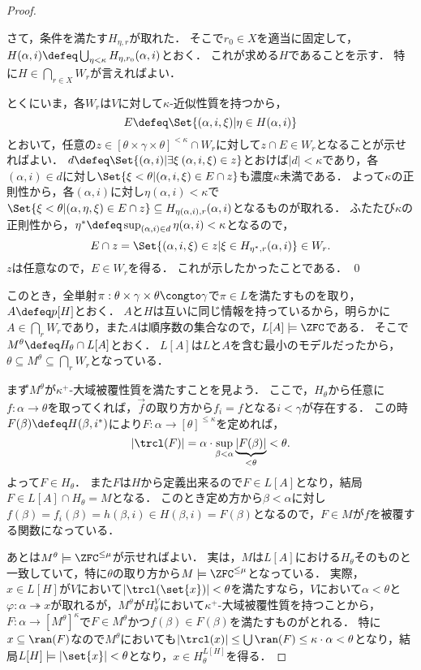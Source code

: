 \documentclass[a4j,leqno]{ltjsarticle}
\begin{document}
\begin{proof}
\begin{subproof}
  さて，条件を満たす$H_{\eta, r}$が取れた．
  そこで$r_0 \in X$を適当に固定して，$H(\alpha, i) \defeq \bigcup_{\eta < \kappa} H_{\eta, r_0}(\alpha, i)$とおく．
  これが求める$H$であることを示す．
  特に$H \in \bigcap_{r\in X} W_r$が言えればよい．

  とくにいま，各$W_r$は$V$に対して$\kappa$-近似性質を持つから，
  \[
   E \defeq \Set{ (\alpha, i, \xi) | \eta \in H(\alpha, i)}
  \]
  とおいて，任意の$z \in [\theta \times \gamma \times \theta]^{<\kappa} \cap W_r$に対して$z \cap E \in W_r$となることが示せればよい．
  $d \defeq \Set{ (\alpha, i) | \exists \xi \: (\alpha, i, \xi) \in z}$とおけば$|d| < \kappa$であり，各$(\alpha, i) \in d$に対し$\Set{\xi < \theta | (\alpha, i, \xi) \in E \cap z}$も濃度$\kappa$未満である．
  よって$\kappa$の正則性から，各$(\alpha, i)$に対し$\eta(\alpha, i) < \kappa$で$\Set{\xi < \theta | (\alpha, \eta, \xi) \in E \cap z} \subseteq H_{\eta(\alpha, i), r}(\alpha, i)$となるものが取れる．
  ふたたび$\kappa$の正則性から，$\eta^* \defeq \sup_{(\alpha, i) \in d} \eta(\alpha, i) < \kappa$となるので，
  \[
   E \cap z = \Set{ (\alpha, i, \xi) \in z | \xi \in H_{\eta^*, r}(\alpha, i)} \in W_r.
  \]
  $z$は任意なので，$E \in W_r$を得る．
  これが示したかったことである． \qed
 \end{subproof}
 このとき，全単射$\pi: \theta \times \gamma \times \theta \congto \gamma$で$\pi \in L$を満たすものを取り，$A \defeq p[H]$とおく．
 $A$と$H$は互いに同じ情報を持っているから，明らかに$A \in \bigcap_r W_r$であり，また$A$は順序数の集合なので，$L[A]\models \ZFC$である．
 そこで$M^\theta \defeq H_\theta \cap L[A]$とおく．
 $L[A]$は$L$と$A$を含む最小のモデルだったから，$\theta \subseteq M^\theta \subseteq \bigcap_r W_r$となっている．

 まず$M^\theta$が$\kappa^+$-大域被覆性質を満たすことを見よう．
 ここで，$H_\theta$から任意に$f: \alpha \to \theta$を取ってくれば，$\vec{f}$の取り方から$f_i = f$となる$i < \gamma$が存在する．
 この時$F(\beta) \defeq H(\beta, i^*)$により$F: \alpha \to [\theta]^{\leq \kappa}$を定めれば，
 \[
  \left| \trcl(F) \right| = \alpha \cdot \sup_{\beta < \alpha} \underbrace{|F(\beta)|}_{< \theta} < \theta.
 \]
 よって$F \in H_\theta$．
 また$F$は$H$から定義出来るので$F \in L[A]$となり，結局$F \in L[A] \cap H_\theta = M$となる．
 このとき定め方から$\beta < \alpha$に対し$f(\beta) = f_i(\beta) = h(\beta, i) \in H(\beta, i) = F(\beta)$となるので，$F \in M$が$f$を被覆する関数になっている．

 あとは$M^\theta \models \ZFC^{\leq\mu}$が示せればよい．
 実は，$M$は$L[A]$における$H_\theta$そのものと一致していて，特に$\theta$の取り方から$M \models \ZFC^{\leq \mu}$となっている．
 実際， $x \in L[H]$が$V$において$\left\lvert\trcl(\set{x})\right\rvert < \theta$を満たすなら，$V$において$\alpha < \theta$と$\varphi: \alpha \twoheadrightarrow x$が取れるが，$M^\theta$が$H_\theta^V$において$\kappa^+$-大域被覆性質を持つことから，$F: \alpha \to [M^\theta]^{\kappa}$で$F \in M^\theta$かつ$f(\beta) \in F(\beta)$を満たすものがとれる．
 特に$x \subseteq \ran(F)$なので$M^\theta$においても$|\trcl({x})| \leq \bigcup \ran(F) \leq \kappa \cdot \alpha < \theta$となり，結局$L[H] \models \left\lvert\set{x}\right\rvert < \theta$となり，$x \in H_\theta^{L[H]}$を得る．


\end{proof}
\end{document}
